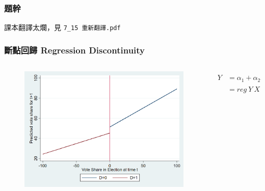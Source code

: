\begin{frame}
    \frametitle{題幹}

    課本翻譯太爛，見 \texttt{7\_15 重新翻譯.pdf}
    
\end{frame}

\begin{frame}
    \frametitle{斷點回歸 Regression Discontinuity}
    \begin{columns}
        \begin{column}{0.6\textwidth}
            \begin{figure}
                \includegraphics[width=\textwidth]{../Results/7_15_b.png}
            \end{figure}        
        \end{column}

        \begin{column}{0.4\textwidth}
            \begin{align*}
                Y &= \alpha_1 + \alpha_2 X + D(\beta_1 + \beta_2 X) \\
                &=reg~Y ~X~D~XD
            \end{align*}
        \end{column}
    \end{columns}
    


    

\end{frame}